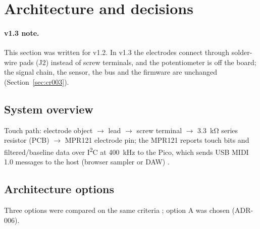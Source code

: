 \section{Architecture and decisions}
\label{sec:architecture}

\paragraph{v1.3 note.} This section was written for v1.2. In v1.3 the electrodes
connect through solder-wire pads (J2) instead of screw terminals, and the
potentiometer is off the board; the signal chain, the sensor, the bus and the
firmware are unchanged (Section~\ref{sec:cr003}).

\subsection{System overview}
Touch path: electrode object $\rightarrow$ lead $\rightarrow$ screw terminal
$\rightarrow$ \qty{3.3}{\kilo\ohm} series resistor (PCB) $\rightarrow$ MPR121
electrode pin; the MPR121 reports touch bits and filtered/baseline data over
I\textsuperscript{2}C at \qty{400}{\kilo\hertz} to the Pico, which sends USB MIDI 1.0
messages to the host (browser sampler or DAW)
 .

\subsection{Architecture options}
Three options were compared on the same criteria
; option A was chosen (ADR-006).

